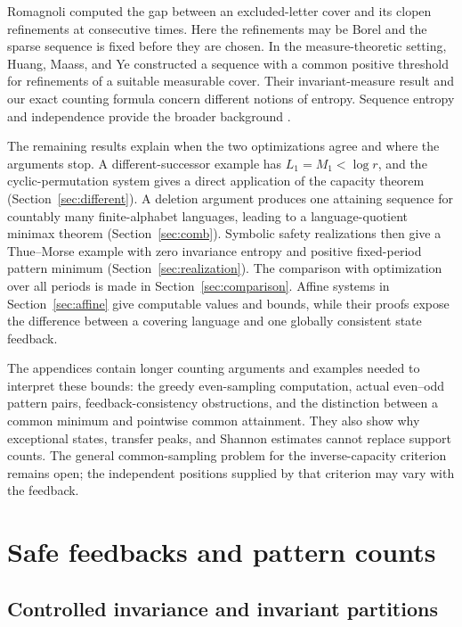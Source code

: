 \documentclass[11pt,reqno]{amsart}
\numberwithin{equation}{section}
\theoremstyle{definition}
\begin{document}
Romagnoli \cite{Romagnoli2007} computed the gap between an
excluded-letter cover and its clopen refinements at consecutive times.
Here the refinements may be Borel and the sparse sequence is fixed
before they are chosen. In the measure-theoretic setting, Huang,
Maass, and Ye \cite[Lemma~3.3 and Theorem~3.5]{HuangMaassYe2004}
constructed a sequence with a common positive threshold for refinements
of a suitable measurable cover. Their invariant-measure result and
our exact counting formula concern different notions of entropy.
Sequence entropy and independence provide the broader background
\cite{Goodman1974,Hulse1982,KamaeZamboniSystems2002,KL2007,KL2009}.

The remaining results explain when the two optimizations agree and
where the arguments stop. A different-successor example has
$L_1=M_1<\log r$, and the cyclic-permutation system gives a direct
application of the capacity theorem (Section~\ref{sec:different}).
A deletion argument produces one attaining sequence for countably
many finite-alphabet languages, leading to a language-quotient minimax
theorem (Section~\ref{sec:comb}). Symbolic safety realizations then
give a Thue--Morse example with zero invariance entropy and positive
fixed-period pattern minimum (Section~\ref{sec:realization}). The
comparison with optimization over all periods is made in
Section~\ref{sec:comparison}. Affine systems in
Section~\ref{sec:affine} give computable values and bounds, while
their proofs expose the difference between a covering language and
one globally consistent state feedback.

The appendices contain longer counting arguments and examples needed
to interpret these bounds: the greedy even-sampling computation,
actual even--odd pattern pairs, feedback-consistency obstructions,
and the distinction between a common minimum and pointwise common
attainment. They also show why exceptional states, transfer peaks,
and Shannon estimates cannot replace support counts. The general
common-sampling problem for the inverse-capacity criterion remains
open; the independent positions supplied by that criterion may vary
with the feedback.


\section{Safe feedbacks and pattern counts}\label{sec:control}

\subsection{Controlled invariance and invariant partitions}
\end{document}
